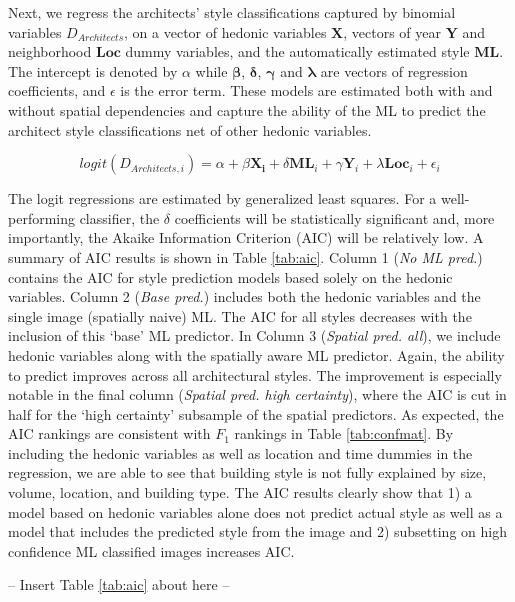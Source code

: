 \documentclass[]{article}
\begin{document}
Next, we regress the architects' style classifications captured by binomial variables \(D_{Architects}\), on a vector of hedonic variables \(\mathbf{X}\), vectors of year \(\mathbf{Y}\) and neighborhood \(\bm{Loc}\) dummy variables, and the automatically estimated style \(\mathbf{ML}\). The intercept is denoted by \(\alpha\) while \(\bm{\beta}\), \(\bm{\delta}\), \(\bm{\gamma}\) and \(\bm{\lambda}\) are vectors of regression coefficients, and \(\epsilon\) is the error term. These models are estimated both with and without spatial dependencies and capture the ability of the ML to predict the architect style classifications net of other hedonic variables. 

\begin{equation} \label{eq:rev}
  logit( D_{Architects,i} ) = \alpha + \beta\mathbf{X_i} + \delta\mathbf{ML}_i +  \gamma\mathbf{Y}_i + \lambda\mathbf{Loc}_i +  \epsilon_i
\end{equation}

The logit regressions are estimated by generalized least squares. For a
well-performing classifier, the \(\delta\) coefficients will be
statistically significant and, more importantly, the
Akaike Information Criterion (AIC) will be relatively low. A summary of AIC results is shown in Table \ref{tab:aic}. Column 1 (\emph{No ML pred.}) contains the AIC for style prediction models based solely on the hedonic variables. Column 2 (\emph{Base pred.}) includes both the hedonic variables and the single image (spatially naive) ML. The AIC for all styles decreases with the inclusion of this `base' ML predictor. In Column 3 (\emph{Spatial pred. all}), we include hedonic variables along with the spatially aware ML predictor. Again, the ability to predict improves across all architectural styles. The improvement is especially notable in the final column (\emph{Spatial pred. high certainty}), where the AIC is cut in half for the `high certainty' subsample of the spatial predictors. As expected, the AIC rankings are consistent with $F_{1}$ rankings in Table \ref{tab:confmat}. By including the hedonic variables as well as location and time dummies in the regression, we are able to see that building style is not fully explained by size, volume, location, and building type. The AIC results clearly show that 1) a model based on hedonic variables alone does not predict actual style as well as a model that includes the predicted style from the image and 2) subsetting on high confidence ML classified images increases AIC.  

\begin{center}
  -- Insert Table \ref{tab:aic} about here --
\end{center}
\end{document}
